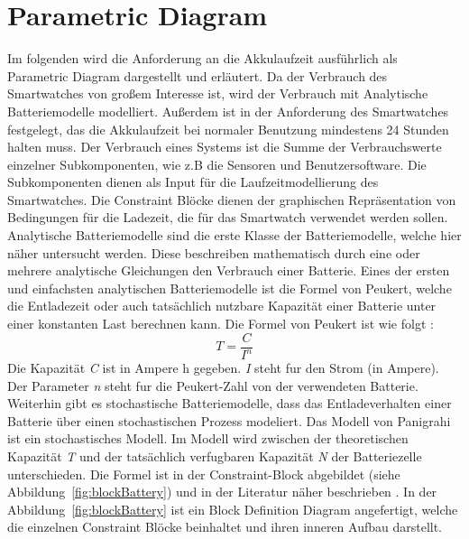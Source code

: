 





\section{Parametric Diagram}
Im folgenden wird die Anforderung an die Akkulaufzeit ausführlich als Parametric Diagram dargestellt und erläutert.
Da der Verbrauch des Smartwatches von großem Interesse ist, wird der Verbrauch
mit Analytische Batteriemodelle modelliert.
Außerdem ist in der Anforderung des Smartwatches festgelegt, das die Akkulaufzeit bei normaler Benutzung mindestens 24 Stunden halten muss. %
Der Verbrauch eines Systems ist die Summe der Verbrauchswerte einzelner Subkomponenten, wie z.B die Sensoren und Benutzersoftware. Die Subkomponenten dienen als Input für die Laufzeitmodellierung des Smartwatches.
Die Constraint Blöcke dienen der graphischen Repräsentation von Bedingungen für die Ladezeit, die für das Smartwatch verwendet werden sollen.
Analytische Batteriemodelle sind die erste Klasse der Batteriemodelle, welche
hier näher untersucht werden.
Diese beschreiben mathematisch durch eine oder mehrere analytische Gleichungen den Verbrauch einer Batterie.
Eines der ersten und einfachsten analytischen Batteriemodelle ist die Formel
von Peukert, welche die Entladezeit oder auch tatsächlich nutzbare Kapazität
einer Batterie unter einer konstanten Last berechnen kann.
Die Formel von Peukert ist wie folgt \cite{peukert}:
\[
T= \frac{C}{I^{n}}
\]
Die Kapazität \textit{C} ist in Ampere h gegeben.
\textit{I} steht fur den Strom (in Ampere). Der Parameter \textit{n} steht fur die
Peukert-Zahl von der verwendeten Batterie.\\
Weiterhin gibt es stochastische Batteriemodelle, dass das Entladeverhalten einer Batterie
über einen stochastischen Prozess modeliert.
Das Modell von Panigrahi ist ein stochastisches Modell.
Im Modell wird zwischen der theoretischen Kapazität \textit{T} und der tatsächlich verfugbaren
Kapazität \textit{N} der Batteriezelle unterschieden.
Die Formel ist in der Constraint-Block abgebildet (siehe Abbildung~\ref{fig:blockBattery}) und in der Literatur näher beschrieben \cite{pan}.
In der Abbildung~\ref{fig:blockBattery} ist ein Block Definition Diagram angefertigt, welche die einzelnen Constraint Blöcke beinhaltet und ihren inneren Aufbau darstellt.

